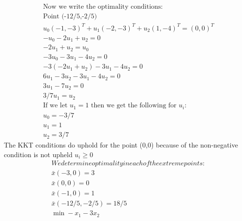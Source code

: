 \documentclass[12pt]{article}
\begin{document}
    \begin{align*}
        &\text{Now we write the optimality conditions: }\\
        &\text{Point (-12/5,-2/5)}\\
        & u_0 (-1,-3)^T + u_1 (-2,-3)^T + u_2 (1,-4)^T = (0,0)^T\\
        &-u_0 - 2u_1 + u_2 = 0\\
        &-2u_1 + u_2 = u_0\\
        &-3u_0 - 3u_1 - 4u_2 = 0\\
        &-3(-2u_1 + u_2) - 3u_1 - 4u_2= 0\\
        &6 u_1 - 3u_2 - 3u_1 - 4u_2 =0\\
        &3 u_1 - 7u_2 = 0 \\
        &3/7u_1 = u_2\\
        &\text{If we let } u_1 = 1 \text{ then we get the following for }u_i:\\
        &u_0 = -3/7\\
        &u_1 = 1\\
        &u_2 = 3/7
    \end{align*}
    The KKT conditions do uphold for the point (0,0) because of the non-negative condition is not upheld $u_i \geq 0$\\
    \begin{align*}
        &We determine optimality in each of the extreme points: \\
        &\bar x (-3,0) = 3\\
        &\bar x (0,0) = 0\\
        &\bar x (-1,0) = 1\\
        &\bar x (-12/5,-2/5) = 18/5\\
        &\min -x_1 - 3x_2 \\ 
    \end{align*}
\end{document}
